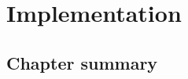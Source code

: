 \chapter{Implementation}
\label{chap:Implementation}


\section{Chapter summary}
\label{sec:Chapter summary}
